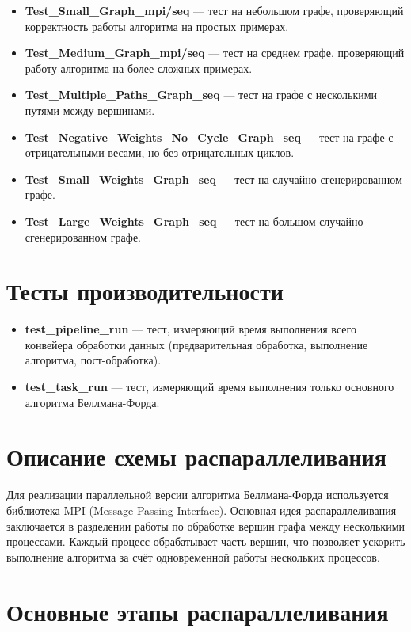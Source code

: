 \documentclass[12pt]{article}
\begin{document}
\begin{itemize}
    \item \textbf{Test\_Small\_Graph\_mpi/seq} — тест на небольшом графе, проверяющий корректность работы алгоритма на простых примерах.
    \item \textbf{Test\_Medium\_Graph\_mpi/seq} — тест на среднем графе, проверяющий работу алгоритма на более сложных примерах.
    \item \textbf{Test\_Multiple\_Paths\_Graph\_seq} — тест на графе с несколькими путями между вершинами.
    \item \textbf{Test\_Negative\_Weights\_No\_Cycle\_Graph\_seq} — тест на графе с отрицательными весами, но без отрицательных циклов.
    \item \textbf{Test\_Small\_Weights\_Graph\_seq} — тест на случайно сгенерированном графе.
    \item \textbf{Test\_Large\_Weights\_Graph\_seq} — тест на большом случайно сгенерированном графе.
\end{itemize}

\section*{Тесты производительности}

\begin{itemize}
    \item \textbf{test\_pipeline\_run} — тест, измеряющий время выполнения всего конвейера обработки данных (предварительная обработка, выполнение алгоритма, пост-обработка).
    \item \textbf{test\_task\_run} — тест, измеряющий время выполнения только основного алгоритма Беллмана-Форда.
\end{itemize}

\section*{Описание схемы распараллеливания}

Для реализации параллельной версии алгоритма Беллмана-Форда используется библиотека MPI (Message Passing Interface). Основная идея распараллеливания заключается в разделении работы по обработке вершин графа между несколькими процессами. Каждый процесс обрабатывает часть вершин, что позволяет ускорить выполнение алгоритма за счёт одновременной работы нескольких процессов.

\section*{Основные этапы распараллеливания}
\end{document}
